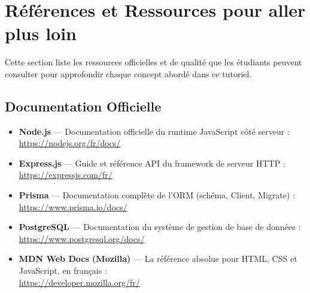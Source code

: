 \newpage

\section*{Références et Ressources pour aller plus loin}

Cette section liste les ressources officielles et de qualité que les étudiants peuvent consulter pour approfondir chaque concept abordé dans ce tutoriel.

\subsection*{Documentation Officielle}
\begin{itemize}
    \item \textbf{Node.js} --- Documentation officielle du runtime JavaScript côté serveur :\\
    \href{https://nodejs.org/fr/docs/}{https://nodejs.org/fr/docs/}

    \item \textbf{Express.js} --- Guide et référence API du framework de serveur HTTP :\\
    \href{https://expressjs.com/fr/}{https://expressjs.com/fr/}

    \item \textbf{Prisma} --- Documentation complète de l'ORM (schéma, Client, Migrate) :\\
    \href{https://www.prisma.io/docs/}{https://www.prisma.io/docs/}

    \item \textbf{PostgreSQL} --- Documentation du système de gestion de base de données :\\
    \href{https://www.postgresql.org/docs/}{https://www.postgresql.org/docs/}

    \item \textbf{MDN Web Docs (Mozilla)} --- La référence absolue pour HTML, CSS et JavaScript, en français :\\
    \href{https://developer.mozilla.org/fr/}{https://developer.mozilla.org/fr/}
\end{itemize}

